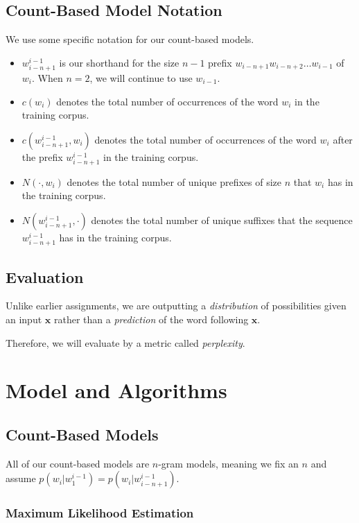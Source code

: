\documentclass[11pt]{article}
\begin{document}
\subsection{Count-Based Model Notation}

We use some specific notation for our count-based models. 
\begin{itemize}
  \item $w^{i-1}_{i-n+1}$ is our shorthand for the size $n-1$ prefix $w_{i-n+1}w_{i-n+2}\dots w_{i-1}$ of $w_i$. When $n = 2$, we will continue to use $w_{i-1}$. 
  \item $c(w_i)$ denotes the total number of occurrences of the word $w_i$ in the training corpus. 
  \item $c(w^{i-1}_{i-n+1}, w_i)$ denotes the total number of occurrences of the word $w_i$ after the prefix $w^{i-1}_{i-n+1}$ in the training corpus. 
  \item $N(\cdot, w_i)$ denotes the total number of unique prefixes of size $n$ that $w_i$ has in the training corpus. 
  \item $N(w^{i-1}_{i-n+1}, \cdot)$ denotes the total number of unique suffixes that the sequence $w^{i-1}_{i-n+1}$ has in the training corpus. 
\end{itemize}

\subsection{Evaluation}

Unlike earlier assignments, we are outputting a \emph{distribution} of possibilities given an input $\mathbf{x}$ rather than a \emph{prediction} of the word following $\mathbf{x}$. 

Therefore, we will evaluate by a metric called \emph{perplexity}. 

\section{Model and Algorithms}

\subsection{Count-Based Models}

All of our count-based models are $n$-gram models, meaning we fix an $n$ and assume $p(w_i|w^{i-1}_1) = p(w_i|w^{i-1}_{i-n+1})$. 

\subsubsection{Maximum Likelihood Estimation}
\end{document}
